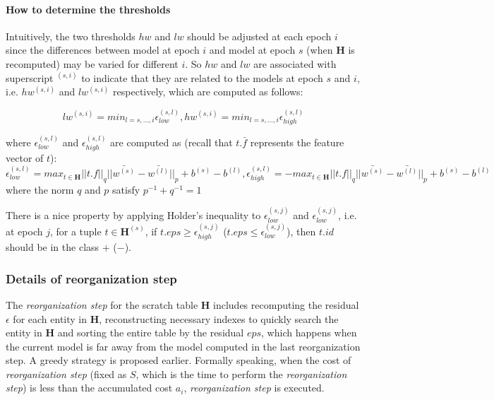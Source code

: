 \paragraph{How to determine the thresholds}
Intuitively, the two thresholds $hw$ and $lw$ should be adjusted at each epoch $i$ since the differences between model at epoch $i$ and model at epoch $s$ (when $\textbf{H}$ is recomputed) may be varied for different $i$. So $hw$ and $lw$ are associated with superscript $^{(s,i)}$ to indicate that they are related to the models at epoch $s$ and $i$, i.e. $hw^{(s,i)}$ and $lw^{(s,i)}$ respectively, which are computed as follows:

\begin{equation}
    lw^{(s,i)} = min_{l=s,\dots, i}\epsilon_{low}^{(s,l)},
    hw^{(s,i)} = min_{l=s,\dots, i}\epsilon_{high}^{(s,l)}
\end{equation}

where $\epsilon_{low}^{(s,l)}$ and $\epsilon_{high}^{(s,l)}$ are computed as (recall that $t.\bar{f}$ represents the feature vector of $t$):
\begin{equation}
    \epsilon_{low}^{(s,l)} = max_{t \in \textbf{H}}||t.f||_q||\bar{w^{(s)}}-\bar{w^{(l)}}||_p+b^{(s)}-b^{(l)}, \epsilon_{high}^{(s,l)} = - max_{t \in \textbf{H}}||t.f||_q||\bar{w^{(s)}}-\bar{w^{(l)}}||_p+b^{(s)}-b^{(l)}
\end{equation}
where the norm $q$ and $p$ satisfy $p^{-1} + q^{-1} = 1$


There is a nice property by applying Holder's inequality \cite{rudin1976principles} to $\epsilon_{low}^{(s,j)}$ and $\epsilon_{low}^{(s,j)}$, i.e. at epoch $j$, for a tuple $t \in \textbf{H}^{(s)}$, if $t.eps \geq \epsilon_{high}^{(s,j)}$ ($t.eps \leq \epsilon_{low}^{(s,j)}$), then $t.id$ should be in the class $+$ ($-$).

\subsubsection{Details of reorganization step}
The {\em reorganization step} for the scratch table $\textbf{H}$ includes recomputing the residual $\epsilon$ for each entity in $\textbf{H}$, reconstructing necessary indexes to quickly search the entity in $\textbf{H}$ and sorting the entire table by the residual $eps$, which happens when the current model is far away from the model computed in the last reorganization step. A greedy strategy is proposed earlier.  Formally speaking, when the cost of {\em reorganization step} (fixed as $S$, which is the time to perform the {\em reorganization step}) is less than the accumulated cost $a_{i}$, {\em reorganization step} is executed.

